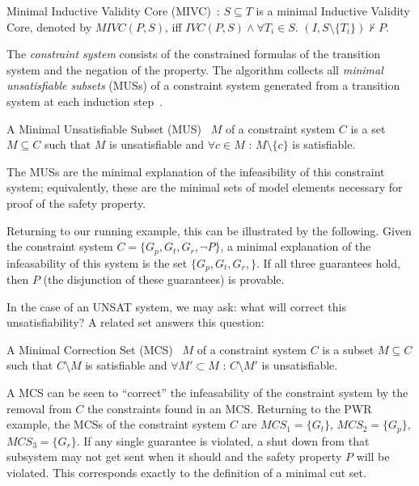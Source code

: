 \begin{definition}
Minimal Inductive Validity Core (MIVC)~\cite{Ghassabani2017EfficientGO}: $S \subseteq T$ is a minimal Inductive Validity Core, denoted by $\mathit{MIVC(P,S)}$, iff $\mathit{IVC(P,S)} \land \forall T_i \in S$. $(I, S \setminus \{T_i\}) \not \vdash P$.
\end{definition}

The {\em constraint system} consists of the constrained formulas of the transition system and the negation of the property. The \aivcalg algorithm collects all {\em minimal unsatisfiable subsets} (MUSs) of a constraint system generated from a transition system at each induction step~\cite{Ghassabani2017EfficientGO,bendik2018online}. 

\begin{definition}
A Minimal Unsatisfiable Subset (MUS)~\cite{reiter1987theory} $M$ of a constraint system $C$ is a set $M \subseteq C$ such that $M$ is unsatisfiable and $\forall c \in M$ : $M \setminus \{c\}$ is satisfiable.
\end{definition}
The MUSs are the minimal explanation of the infeasibility of this constraint system; equivalently, these are the minimal sets of model elements necessary for proof of the safety property.

Returning to our running example, this can be illustrated by the following. Given the constraint system $C = \{G_p, G_t, G_r, \neg P\}$, a minimal explanation of the infeasability of this system is the set $\{G_p, G_t, G_r,\}$. If all three guarantees hold, then $P$ (the disjunction of these guarantees) is provable. 

In the case of an UNSAT system, we may ask: what will correct this unsatisfiability? A related set answers this question: 
\begin{definition}
A Minimal Correction Set (MCS)~\cite{reiter1987theory} $M$ of a constraint system $C$ is a subset $M\subseteq C$ such that $C \setminus M$ is satisfiable and $\forall M' \subset M$ : $C \setminus M'$ is unsatisfiable.
\end{definition}
A MCS can be seen to ``correct'' the infeasability of the constraint system by the removal from $C$ the constraints found in an MCS. Returning to the PWR example, the MCSs of the constraint system $C$ are $\mathit{MCS}_1 = \{G_t\}$, $\mathit{MCS}_2 = \{G_p\}$, $\mathit{MCS}_3 = \{G_r\}$. If any single guarantee is violated, a shut down from that subsystem may not get sent when it should and the safety property $P$ will be violated. This corresponds exactly to the definition of a minimal cut set.

